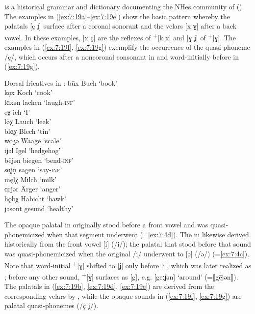 \citet{Hofmann1926} is a historical grammar and dictionary documenting the NHes community of  (). The examples in (\ref{ex:7:19a}--\ref{ex:7:19e}) show the basic pattern whereby the palatals [ç ʝ] surface after a coronal sonorant and the velars [x ɣ] after a back vowel. In these examples, [x ç] are the reflexes of   \textsuperscript{+}[k x] and [ɣ ʝ] of   \textsuperscript{+}[ɣ]. The examples in (\ref{ex:7:19f}, \ref{ex:7:19g}) exemplify the occurrence of the quasi-phoneme /ç/, which occurs after a noncoronal consonant in  and word-initially before  in (\ref{ex:7:19g}).

\ea%
\label{ex:7:19}Dorsal fricatives in :
\ea\label{ex:7:19a} būx  \tab [buːx] \tab Buch \tab ‘book’ \\
kǫx \tab [kɔx] \tab Koch \tab ‘cook’ \\
lɑxən \tab [lɑxən] \tab lachen \tab ‘laugh\textsc{{}-inf}’ \\
\ex\label{ex:7:19b} eχ  \tab [eç] \tab ich \tab ‘I’ \\
l\={ø}χ \tab [løːç] \tab  Lauch \tab ‘leek’ \\
blɑ̜χ \tab [blæç] \tab Blech \tab ‘tin’ \\
\ex\label{ex:7:19c} wōʒə \tab [βoːɣə] \tab Waage \tab ‘scale’ \\
\ex\label{ex:7:19d} ijəl \tab [iʝəl] \tab Igel \tab ‘hedgehog’ \\
bējən \tab [beːʝən] \tab biegen \tab ‘bend\textsc{{}-inf}’ \\
sɑ̜̜̄jṇ \tab [sæːʝn̩] \tab sagen \tab ‘say\textsc{{}-inf}’ \\
\ex\label{ex:7:19e} męlχ \tab [mɛlç] \tab Milch \tab ‘milk’ \\
ɑ̜rjər \tab [ærʝər] \tab Ärger \tab ‘anger’ \\
\ex\label{ex:7:19f} hǫbχ \tab [hɔpç] \tab Habicht \tab ‘hawk’ \\
\ex\label{ex:7:19g} jəsønt \tab [ʝəsønt] \tab gesund \tab ‘healthy’ 
\z
\z 

The opaque palatal in  originally stood before a front vowel and was quasi-phonemicized when that segment underwent  (=\ref{ex:7:4d}). The  in  likewise derived historically from the front vowel [i] (/i/); the palatal that stood before that sound was quasi-phonemicized when the original /i/ underwent  to [ə] (/ə/) (=\ref{ex:7:4c}). Note that word-initial  \textsuperscript{+}[ɣ] shifted to [ʝ] only before [i], which was later realized as ; before any other sound,   \textsuperscript{+}[ɣ] surfaces as [g], e.g. [geːʝən] ‘around’ (=⟦gējən⟧). The palatals in (\ref{ex:7:19b}, \ref{ex:7:19d}, \ref{ex:7:19e}) are derived from the corresponding velars by , while the opaque sounds in (\ref{ex:7:19f}, \ref{ex:7:19g}) are palatal quasi-phonemes (/ç ʝ/).

